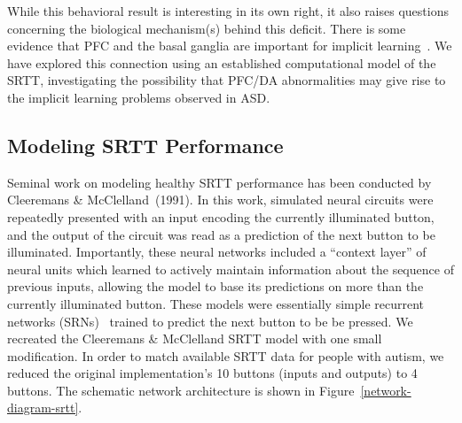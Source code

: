 While this behavioral result is interesting in its own right, it also raises questions concerning the biological mechanism(s) behind this deficit. There is some evidence that PFC and the basal ganglia are important for implicit learning~\cite{MatsumotoN:1999:Sequential,PascualLeone:2004:PFCImplicit}. We have explored this connection using an established computational model of the SRTT, investigating the possibility that PFC/DA abnormalities may give rise to the implicit learning problems observed in ASD.


\subsection{Modeling SRTT Performance}
Seminal work on modeling healthy SRTT performance has been conducted by \nocite{CleeremansA:1991:SSRT} Cleeremans \& McClelland~(1991). In this work, simulated neural circuits were repeatedly presented with an input encoding the currently illuminated button, and the output of the circuit was read as a prediction of the next button to be illuminated. Importantly, these neural networks included a ``context layer'' of neural units which learned to actively maintain information about the sequence of previous inputs, allowing the model to base its predictions on more than the currently illuminated button. These models were essentially simple recurrent networks (SRNs)~\cite{ElmanJ:1990:SRN} trained to predict the next button to be be pressed. We recreated the Cleeremans \& McClelland SRTT model with one small modification. In order to match available SRTT data for people with autism, we reduced the original implementation's 10 buttons (inputs and outputs) to 4 buttons. The schematic network architecture is shown in Figure~\ref{network-diagram-srtt}.  

